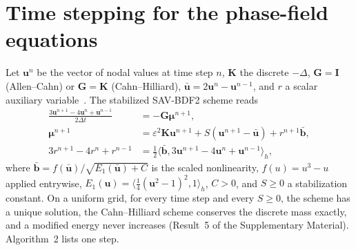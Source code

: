 \documentclass[preprint,12pt]{elsarticle}
\theoremstyle{remark}
\begin{document}
\section{Time stepping for the phase-field equations}\label{app:sav}
Let $\mathbf u^n$ be the vector of nodal values at time step $n$, $\mathbf K$ the discrete $-\Delta$, $\mathbf G=\mathbf I$ (Allen--Cahn) or $\mathbf G=\mathbf K$ (Cahn--Hilliard), $\bar{\mathbf u}=2\mathbf u^n-\mathbf u^{n-1}$, and
$r$ a scalar auxiliary variable~\cite{shen2018scalar}. The stabilized SAV-BDF2 scheme reads
\begin{align}
\frac{3\mathbf u^{n+1}-4\mathbf u^n+\mathbf u^{n-1}}{2\Delta t}&=-\mathbf G\boldsymbol\mu^{n+1},\label{eq:sav1}\\
\boldsymbol\mu^{n+1}&=\varepsilon^2\mathbf K\mathbf u^{n+1}+S(\mathbf u^{n+1}-\bar{\mathbf u})+r^{n+1}\bar{\mathbf b},\label{eq:sav1b}\\
3r^{n+1}-4r^n+r^{n-1}&=\tfrac12\langle\bar{\mathbf b},3\mathbf u^{n+1}-4\mathbf u^n+\mathbf u^{n-1}\rangle_h,\label{eq:sav2}
\end{align}
where $\bar{\mathbf b}=f(\bar{\mathbf u})/\sqrt{E_1(\bar{\mathbf u})+C}$ is the scaled nonlinearity, $f(u)=u^3-u$ applied entrywise,
$E_1(\mathbf u)=\langle\frac14(\mathbf u^2-1)^2,1\rangle_h$, $C>0$, and $S\ge0$ a stabilization constant. On a uniform
grid, for every time step and every $S\ge0$, the scheme has a unique solution, the Cahn--Hilliard scheme
conserves the discrete mass exactly, and a modified energy never increases (Result~5 of the Supplementary
Material). Algorithm~2 lists one step.
\end{document}

